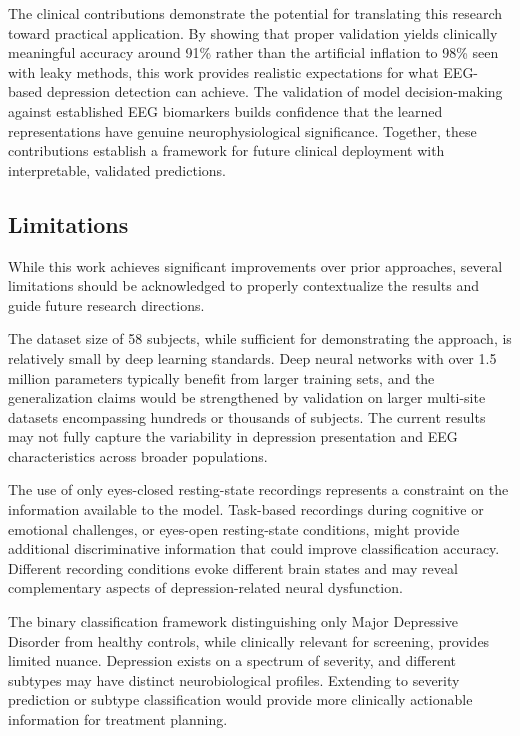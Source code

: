 The clinical contributions demonstrate the potential for translating this research toward practical application. By showing that proper validation yields clinically meaningful accuracy around 91\% rather than the artificial inflation to 98\% seen with leaky methods, this work provides realistic expectations for what EEG-based depression detection can achieve. The validation of model decision-making against established EEG biomarkers builds confidence that the learned representations have genuine neurophysiological significance. Together, these contributions establish a framework for future clinical deployment with interpretable, validated predictions.

\subsection{Limitations}

While this work achieves significant improvements over prior approaches, several limitations should be acknowledged to properly contextualize the results and guide future research directions.

The dataset size of 58 subjects, while sufficient for demonstrating the approach, is relatively small by deep learning standards. Deep neural networks with over 1.5 million parameters typically benefit from larger training sets, and the generalization claims would be strengthened by validation on larger multi-site datasets encompassing hundreds or thousands of subjects. The current results may not fully capture the variability in depression presentation and EEG characteristics across broader populations.

The use of only eyes-closed resting-state recordings represents a constraint on the information available to the model. Task-based recordings during cognitive or emotional challenges, or eyes-open resting-state conditions, might provide additional discriminative information that could improve classification accuracy. Different recording conditions evoke different brain states and may reveal complementary aspects of depression-related neural dysfunction.

The binary classification framework distinguishing only Major Depressive Disorder from healthy controls, while clinically relevant for screening, provides limited nuance. Depression exists on a spectrum of severity, and different subtypes may have distinct neurobiological profiles. Extending to severity prediction or subtype classification would provide more clinically actionable information for treatment planning.

